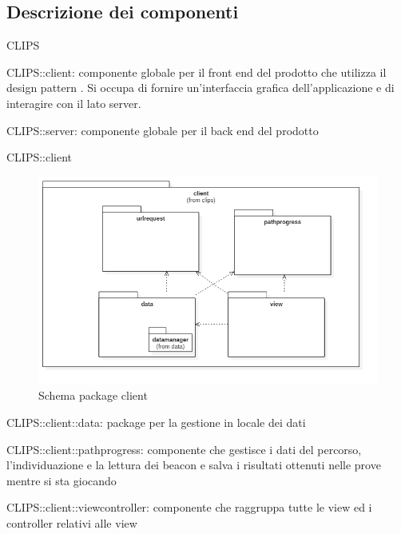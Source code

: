 \subsection{Descrizione dei componenti}
\begin{componente}{CLIPS}
\begin{compPackageContenuti}
\item CLIPS::client: componente globale per il front end del prodotto che utilizza il design pattern . Si occupa di fornire un'interfaccia grafica dell'applicazione e di interagire con il lato server.
\item CLIPS::server: componente globale per il back end del prodotto
\end{compPackageContenuti}
\end{componente}
\begin{componente}{CLIPS::client}
\begin{figure}[h!]
\centering
\includegraphics[scale=0.5]{img/package/png/client.png}
\caption{Schema package client}
 \end{figure}
\begin{compPackageContenuti}
\item CLIPS::client::data: package per la gestione in locale dei dati
\item CLIPS::client::pathprogress: componente che gestisce i dati del percorso, l'individuazione e la lettura dei beacon e salva i risultati ottenuti nelle prove mentre si sta giocando
\item CLIPS::client::viewcontroller: componente che raggruppa tutte le view ed i controller relativi alle view
\end{compPackageContenuti}
\end{componente}
